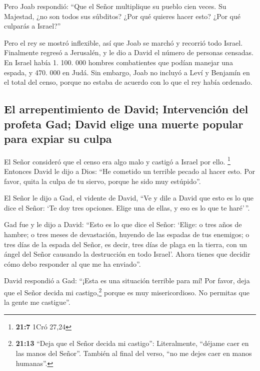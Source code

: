  Pero Joab respondió: ``Que el Señor multiplique su pueblo
cien veces. Su Majestad, ¿no son todos sus súbditos? ¿Por qué quieres
hacer esto? ¿Por qué culparás a Israel?''

 Pero el rey se mostró inflexible, así que Joab se marchó
y recorrió todo Israel. Finalmente regresó a Jerusalén,  y
le dio a David el número de personas censadas. En Israel había 1. 100.
000 hombres combatientes que podían manejar una espada, y 470. 000 en
Judá.  Sin embargo, Joab no incluyó a Leví y Benjamín en
el total del censo, porque no estaba de acuerdo con lo que el rey había
ordenado.

\hypertarget{el-arrepentimiento-de-david-intervenciuxf3n-del-profeta-gad-david-elige-una-muerte-popular-para-expiar-su-culpa}{%
\subsection{El arrepentimiento de David; Intervención del profeta Gad;
David elige una muerte popular para expiar su
culpa}\label{el-arrepentimiento-de-david-intervenciuxf3n-del-profeta-gad-david-elige-una-muerte-popular-para-expiar-su-culpa}}

 El Señor consideró que el censo era algo malo y castigó a
Israel por ello. \footnote{\textbf{21:7} 1Cró 27,24} 
Entonces David le dijo a Dios: ``He cometido un terrible pecado al hacer
esto. Por favor, quita la culpa de tu siervo, porque he sido muy
estúpido''.

 El Señor le dijo a Gad, el vidente de David,
 ``Ve y dile a David que esto es lo que dice el Señor:
`Te doy tres opciones. Elige una de ellas, y eso es lo que te haré'\,''.

 Gad fue y le dijo a David: ``Esto es lo que dice el
Señor: `Elige:  o tres años de hambre; o tres meses de
devastación, huyendo de las espadas de tus enemigos; o tres días de la
espada del Señor, es decir, tres días de plaga en la tierra, con un
ángel del Señor causando la destrucción en todo Israel'. Ahora tienes
que decidir cómo debo responder al que me ha enviado''.

 David respondió a Gad: ``¡Esta es una situación terrible
para mí! Por favor, deja que el Señor decida mi castigo,\footnote{\textbf{21:13}
  ``Deja que el Señor decida mi castigo'': Literalmente, ``déjame caer
  en las manos del Señor''. También al final del verso, ``no me dejes
  caer en manos humanas''.} porque es muy misericordioso. No permitas
que la gente me castigue''.

